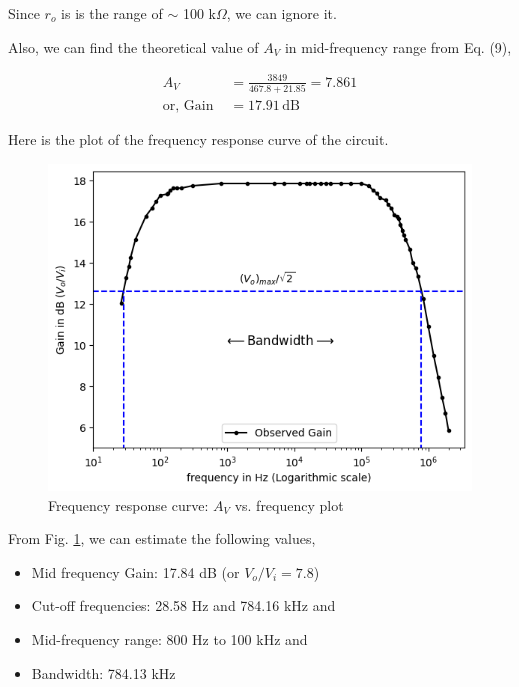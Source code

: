 Since $r_o$ is is the range of $\sim$ 100 k$\Omega$, we can ignore it.

Also, we can find the theoretical value of $A_V$ in mid-frequency range from Eq. (9),

\begin{align*}
    A_V &= \frac{3849}{467.8+21.85} = 7.861\\
    \text{or, Gain }&= 17.91\,\text{dB}
\end{align*}

Here is the plot of the frequency response curve of the circuit.
\begin{figure}[H]
    \centering
    \includegraphics[width=1\columnwidth]{images/g1.png}
    \caption{Frequency response curve: $A_V$ vs. frequency plot}
    \label{graph}
\end{figure}

From Fig. \ref{graph}, we can estimate the following values,

\begin{itemize}
    \item Mid frequency Gain: 17.84 dB (or $V_o/V_i=7.8$)
    \item Cut-off frequencies: 28.58 Hz and 784.16 kHz and 
    \item Mid-frequency range: 800 Hz to 100 kHz and 
    \item Bandwidth: 784.13 kHz
\end{itemize}